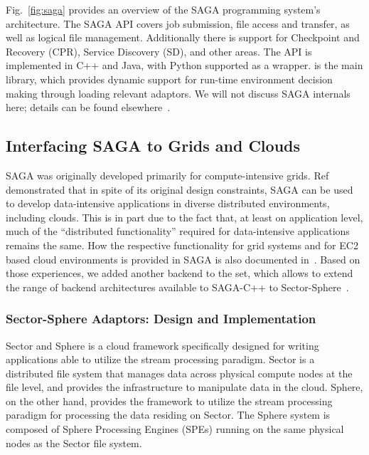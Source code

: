 \documentclass[3p,twocolumn]{elsarticle}
\begin{document}
Fig.~\ref{fig:saga} provides an overview of the SAGA programming
system's architecture.  The SAGA API covers job submission, file
access and transfer, as well as logical file management.  Additionally
there is support for Checkpoint and Recovery (CPR), Service Discovery
(SD), and other areas.  The API is implemented in C++ and Java, with
Python supported as a wrapper.  is the main library,
which provides dynamic support for run-time environment decision
making through loading relevant adaptors. We will not discuss SAGA
internals here; details can be found elsewhere~\cite{saga_url,Kaiser:2006qp}.


\subsection{Interfacing SAGA to Grids and Clouds}


SAGA was originally developed primarily for compute-intensive grids.
Ref~\cite{saga_ccgrid09} demonstrated that in spite of its original
design constraints, SAGA can be used to develop data-intensive
applications in diverse distributed environments, including clouds.
This is in part due to the fact that, at least on application level,
much of the ``distributed functionality'' required for data-intensive
applications remains the same.  How the respective functionality for
grid systems and for EC2 based cloud environments is provided in SAGA
is also documented in~\cite{saga_ccgrid09}.  Based on those
experiences, we added another backend to the set, which allows to
extend the range of backend architectures available to SAGA-C++ to
Sector-Sphere~\cite{sectorsphere09}.


\subsubsection{Sector-Sphere Adaptors: Design and Implementation}

Sector and Sphere is a cloud framework specifically designed for
writing applications able to utilize the stream processing paradigm.
Sector is a distributed file system that manages data across physical
compute nodes at the file level, and provides the infrastructure to
manipulate data in the cloud.  Sphere, on the other hand, provides the
framework to utilize the stream processing paradigm for processing the
data residing on Sector.  The Sphere system is composed of Sphere
Processing Engines (SPEs) running on the same physical nodes as the
Sector file system.
\end{document}
